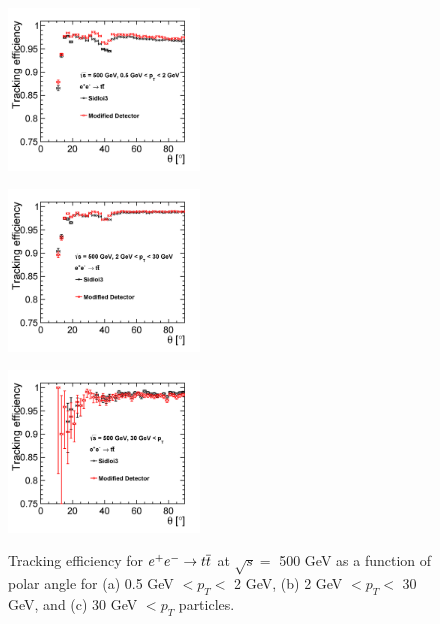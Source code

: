 \begin{figure}[h!]
\begin{minipage}{.33\textwidth}
\centering
\includegraphics[width=2.0in]{eettbarEfficiencyThetaLowPt_sidloi3_det_vtxbar_3doublet.png}
\label{fig:eettbareffthetalowpt}
\end{minipage}%
\begin{minipage}{.33\textwidth}
\centering
\includegraphics[width=2.0in]{eettbarEfficiencyThetaMedPt_sidloi3_det_vtxbar_3doublet.png}
\label{fig:eettbareffthetamedpt}
\end{minipage}
\begin{minipage}{.33\textwidth}
\centering
\includegraphics[width=2.0in]{eettbarEfficiencyTheta30GeV_sidloi3_det_vtxbar_3doublet.png}
\label{fig:eettbareffthetahighpt}
\end{minipage}
\caption{Tracking efficiency for $\ee \rightarrow \ttbar$ at $ \sqrt{s} = $ 500 GeV as a function of polar angle
for (a) 0.5 GeV $< p_{T} < $ 2 GeV, (b) 2 GeV $< p_{T} < $ 30 GeV, and (c) 30 GeV $< p_{T} $ particles.}
\label{fig:eettbarefftheta}
\end{figure}


